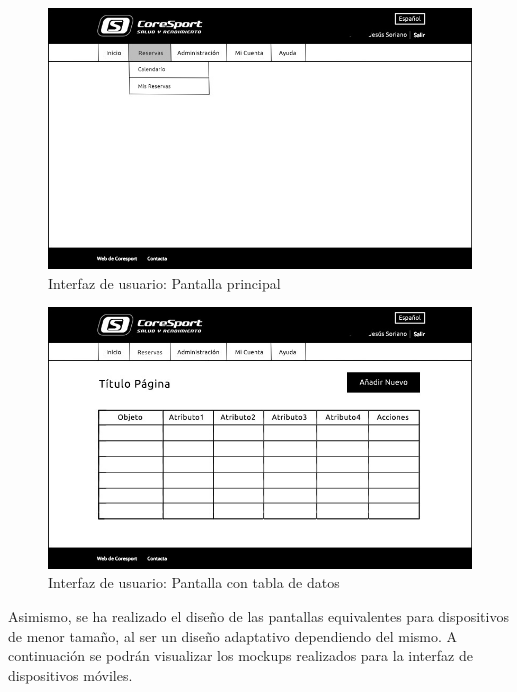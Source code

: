 \begin{figure}[h!]
\centering
  \includegraphics[scale=.40]{img/interfaz/pantalla-principal.jpg}
  \caption{Interfaz de usuario: Pantalla principal}
  \label{fig:interfaz-pantalla-principal}
\end{figure}

\vspace{10mm}

\begin{figure}[h!]
\centering
  \includegraphics[scale=.40]{img/interfaz/cuadro-general.jpg}
  \caption{Interfaz de usuario: Pantalla con tabla de datos}
  \label{fig:interfaz-cuadro-general}
\end{figure}


Asimismo, se ha realizado el diseño de las pantallas equivalentes para dispositivos de menor tamaño, al ser un diseño adaptativo dependiendo del mismo. A continuación se podrán visualizar los mockups realizados para la interfaz de dispositivos móviles.


